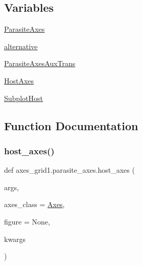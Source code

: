 \subsection*{Variables}
\begin{DoxyCompactItemize}
\item 
\hyperlink{namespaceaxes__grid1_1_1parasite__axes_ad8f6e4dc3befca9f5143e124943be455}{Parasite\+Axes}
\item 
\hyperlink{namespaceaxes__grid1_1_1parasite__axes_a62ea00c0c89bb5e18a00cd8e47bee2c6}{alternative}
\item 
\hyperlink{namespaceaxes__grid1_1_1parasite__axes_aed58be0de6ba8ff984cad29402718150}{Parasite\+Axes\+Aux\+Trans}
\item 
\hyperlink{namespaceaxes__grid1_1_1parasite__axes_a302f3fc6ce63b29e4c771d39d19d4bc0}{Host\+Axes}
\item 
\hyperlink{namespaceaxes__grid1_1_1parasite__axes_a824b93f2aa10c91dac6d7637c7aed534}{Subplot\+Host}
\end{DoxyCompactItemize}


\subsection{Function Documentation}
\mbox{\label{namespaceaxes__grid1_1_1parasite__axes_a4b9af10d8f778f981811c7af670459ac}} 
\subsubsection{\texorpdfstring{host\+\_\+axes()}{host\_axes()}}
{\footnotesize\ttfamily def axes\+\_\+grid1.\+parasite\+\_\+axes.\+host\+\_\+axes (\begin{DoxyParamCaption}\item[{}]{args,  }\item[{}]{axes\+\_\+class = {\ttfamily \hyperlink{classaxes__grid1_1_1mpl__axes_1_1Axes}{Axes}},  }\item[{}]{figure = {\ttfamily None},  }\item[{}]{kwargs }\end{DoxyParamCaption})}

